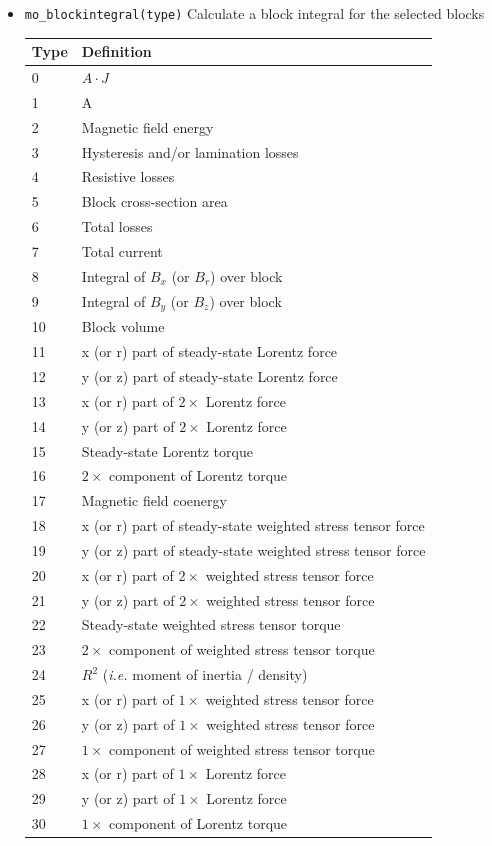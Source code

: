 \begin{itemize}
\item{\tt mo\_blockintegral(type)}
Calculate a block integral for the selected blocks
\begin{center}
\begin{tabular}{ll} \hline
 Type & Definition \\ \hline
 0 & $A \cdot J$ \\
 1 & A \\
 2 & Magnetic field energy \\
 3 & Hysteresis and/or lamination losses \\
 4 & Resistive losses \\
 5 & Block cross-section area \\
 6 & Total losses \\
 7 & Total current \\
 8 & Integral of $B_x$ (or $B_r$) over block \\
 9 & Integral of $B_y$ (or $B_z$) over block \\
 10 & Block volume \\
 11 & x (or r) part of steady-state Lorentz force \\
 12 & y (or z) part of steady-state Lorentz force \\
 13 & x (or r) part of $2\times$ Lorentz force \\
 14 & y (or z) part of $2\times$ Lorentz force \\
 15 & Steady-state Lorentz torque \\
 16 & $2 \times$ component of Lorentz torque \\
 17 & Magnetic field coenergy \\
 18 & x (or r) part of steady-state weighted stress tensor force \\
 19 & y (or z) part of steady-state weighted stress tensor force \\
 20 & x (or r) part of $2\times$ weighted stress tensor force \\
 21 & y (or z) part of $2\times$ weighted stress tensor force \\
 22 & Steady-state weighted stress tensor torque \\
 23 & $2 \times$ component of weighted stress tensor torque \\
 24 & $R^2$ ({\em i.e.} moment of inertia / density) \\ 
 25 & x (or r) part of $1\times$ weighted stress tensor force \\
 26 & y (or z) part of $1\times$ weighted stress tensor force \\
 27 & $1 \times$ component of weighted stress tensor torque \\
 28 & x (or r) part of $1\times$ Lorentz force \\
 29 & y (or z) part of $1\times$ Lorentz force \\
 30 & $1 \times$ component of Lorentz torque \\ \hline
 \end{tabular}
 \end{center}


\end{itemize}
